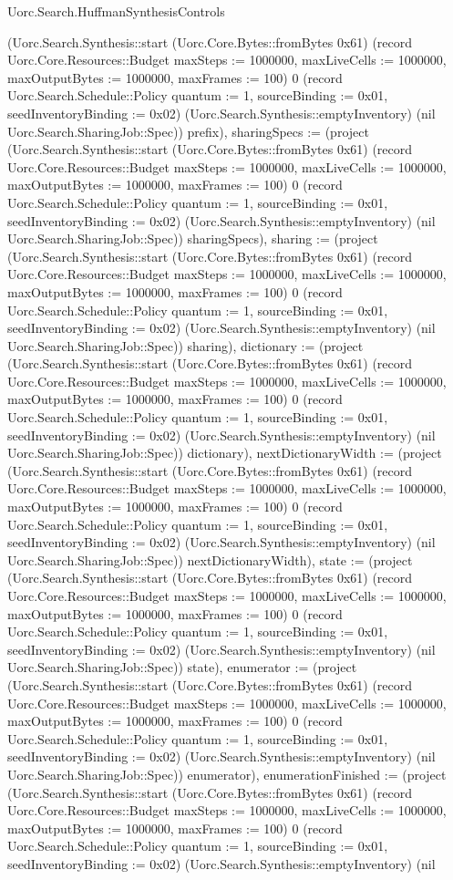 \begin{lexlean}{Uorc.Search.HuffmanSynthesisControls}
\begin{semanticmodule}
{(Uorc.Search.Synthesis::start (Uorc.Core.Bytes::fromBytes 0x61) (record Uorc.Core.Resources::Budget {maxSteps := 1000000, maxLiveCells := 1000000, maxOutputBytes := 1000000, maxFrames := 100}) 0 (record Uorc.Search.Schedule::Policy {quantum := 1, sourceBinding := 0x01, seedInventoryBinding := 0x02}) (Uorc.Search.Synthesis::emptyInventory) (nil Uorc.Search.SharingJob::Spec)) prefix), sharingSpecs := (project (Uorc.Search.Synthesis::start (Uorc.Core.Bytes::fromBytes 0x61) (record Uorc.Core.Resources::Budget {maxSteps := 1000000, maxLiveCells := 1000000, maxOutputBytes := 1000000, maxFrames := 100}) 0 (record Uorc.Search.Schedule::Policy {quantum := 1, sourceBinding := 0x01, seedInventoryBinding := 0x02}) (Uorc.Search.Synthesis::emptyInventory) (nil Uorc.Search.SharingJob::Spec)) sharingSpecs), sharing := (project (Uorc.Search.Synthesis::start (Uorc.Core.Bytes::fromBytes 0x61) (record Uorc.Core.Resources::Budget {maxSteps := 1000000, maxLiveCells := 1000000, maxOutputBytes := 1000000, maxFrames := 100}) 0 (record Uorc.Search.Schedule::Policy {quantum := 1, sourceBinding := 0x01, seedInventoryBinding := 0x02}) (Uorc.Search.Synthesis::emptyInventory) (nil Uorc.Search.SharingJob::Spec)) sharing), dictionary := (project (Uorc.Search.Synthesis::start (Uorc.Core.Bytes::fromBytes 0x61) (record Uorc.Core.Resources::Budget {maxSteps := 1000000, maxLiveCells := 1000000, maxOutputBytes := 1000000, maxFrames := 100}) 0 (record Uorc.Search.Schedule::Policy {quantum := 1, sourceBinding := 0x01, seedInventoryBinding := 0x02}) (Uorc.Search.Synthesis::emptyInventory) (nil Uorc.Search.SharingJob::Spec)) dictionary), nextDictionaryWidth := (project (Uorc.Search.Synthesis::start (Uorc.Core.Bytes::fromBytes 0x61) (record Uorc.Core.Resources::Budget {maxSteps := 1000000, maxLiveCells := 1000000, maxOutputBytes := 1000000, maxFrames := 100}) 0 (record Uorc.Search.Schedule::Policy {quantum := 1, sourceBinding := 0x01, seedInventoryBinding := 0x02}) (Uorc.Search.Synthesis::emptyInventory) (nil Uorc.Search.SharingJob::Spec)) nextDictionaryWidth), state := (project (Uorc.Search.Synthesis::start (Uorc.Core.Bytes::fromBytes 0x61) (record Uorc.Core.Resources::Budget {maxSteps := 1000000, maxLiveCells := 1000000, maxOutputBytes := 1000000, maxFrames := 100}) 0 (record Uorc.Search.Schedule::Policy {quantum := 1, sourceBinding := 0x01, seedInventoryBinding := 0x02}) (Uorc.Search.Synthesis::emptyInventory) (nil Uorc.Search.SharingJob::Spec)) state), enumerator := (project (Uorc.Search.Synthesis::start (Uorc.Core.Bytes::fromBytes 0x61) (record Uorc.Core.Resources::Budget {maxSteps := 1000000, maxLiveCells := 1000000, maxOutputBytes := 1000000, maxFrames := 100}) 0 (record Uorc.Search.Schedule::Policy {quantum := 1, sourceBinding := 0x01, seedInventoryBinding := 0x02}) (Uorc.Search.Synthesis::emptyInventory) (nil Uorc.Search.SharingJob::Spec)) enumerator), enumerationFinished := (project (Uorc.Search.Synthesis::start (Uorc.Core.Bytes::fromBytes 0x61) (record Uorc.Core.Resources::Budget {maxSteps := 1000000, maxLiveCells := 1000000, maxOutputBytes := 1000000, maxFrames := 100}) 0 (record Uorc.Search.Schedule::Policy {quantum := 1, sourceBinding := 0x01, seedInventoryBinding := 0x02}) (Uorc.Search.Synthesis::emptyInventory) (nil }
\end{semanticmodule}
\end{lexlean}
